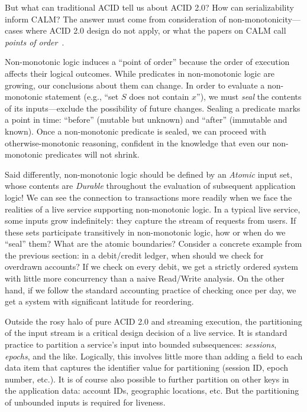 \documentclass{sig-alternate}
\begin{document}
But what can traditional ACID tell us about ACID 2.0?  How can serializability inform CALM?  
The answer must come from consideration of non-monotonicity---cases where ACID 2.0 design do not apply, or what the papers on CALM call \emph{points of order}~\cite{Alvaro2011}.

Non-monotonic logic induces a ``point of order'' because the order of execution affects their logical outcomes.  While predicates in non-monotonic logic are growing, our conclusions about them can change.  In order to evaluate a non-monotonic statement (e.g., ``set $S$ does not contain $x$''), we must \emph{seal} the contents of its inputs---exclude the possibility of future changes.  Sealing a predicate marks a point in time: ``before'' (mutable but unknown) and ``after'' (immutable and known).  Once a non-monotonic predicate is sealed, we can proceed with otherwise-monotonic reasoning, confident in the knowledge that even our non-monotonic predicates will not shrink.  

Said differently, non-monotonic logic should be defined by an \emph{Atomic} input set, whose contents are \emph{Durable} throughout the evaluation of subsequent application logic!  We can see the connection to transactions more readily when we face the realities of a live service supporting non-monotonic logic.  In a typical live service, some inputs grow indefinitely: they capture the stream of requests from users.  If these sets participate transitively in non-monotonic logic, how or when do we ``seal'' them?  What are the atomic boundaries?  Consider a concrete example from the previous section: in a debit/credit ledger, when should we check for overdrawn accounts?  If we check on every debit, we get a strictly ordered system with little more concurrency than a naive Read/Write analysis.  On the other hand, if we follow the standard accounting practice of checking once per day, we get a system with significant latitude for reordering. 

Outside the rosy halo of pure ACID 2.0 and streaming execution, the partitioning of the input stream is a critical design decision of a live service. 
It is standard practice to partition a service's input into bounded subsequences: \emph{sessions}, \emph{epochs}, and the like. Logically, this involves little more than adding a field to each data item that captures the identifier value for partitioning (session ID, epoch number, etc.).  
It is of course also possible to further partition on other keys in the application data: account IDs, geographic locations, etc.  But the partitioning of unbounded inputs is required for liveness.
\end{document}
